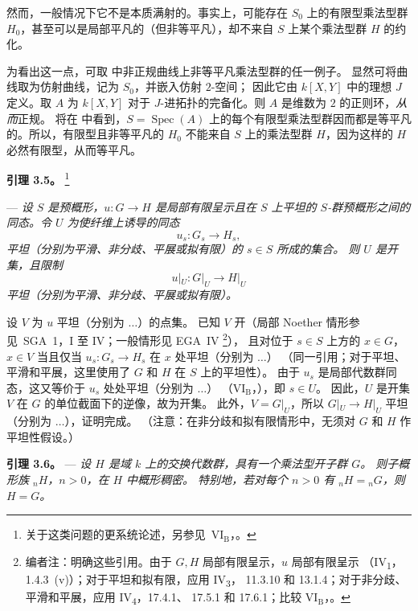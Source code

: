 然而，一般情况下它不是本质满射的。事实上，可能存在 \(S_0\) 上的有限型乘法型群
\(H_0\)，甚至可以是局部平凡的（但非等平凡），却不来自 \(S\) 上某个乘法型群
\(H\) 的约化。

为看出这一点，可取  中非正规曲线上非等平凡乘法型群的任一例子。
显然可将曲线取为仿射曲线，记为 \(S_0\)，并嵌入仿射 \(2\)-空间；
因此它由 \(k[X,Y]\) 中的理想 \(J\) 定义。取 \(A\) 为 \(k[X,Y]\) 对于
\(J\)-进拓扑的完备化。则 \(A\) 是维数为 \(2\) 的正则环，\emph{从而}正规。
将在  中看到，\(S=\operatorname{Spec}(A)\)
上的每个有限型乘法型群因而都是等平凡的。所以，有限型且非等平凡的 \(H_0\)
不能来自 \(S\) 上的乘法型群 \(H\)，因为这样的 \(H\) 必然有限型，从而等平凡。

\medskip
\noindent{}\textbf{引理 3.5。}%
\begingroup
\renewcommand{\thefootnote}{\(\ast\)}%
\footnote{关于这类问题的更系统论述，另参见\ \(\mathrm{VI}_{\mathrm B}\)，。}%
\endgroup
\addtocounter{footnote}{-1}
---
\textit{设 \(S\) 是预概形，\(u:G\to H\) 是局部有限呈示且在 \(S\) 上平坦的
\(S\)-群预概形之间的同态。令 \(U\) 为使纤维上诱导的同态
\[
  u_s:G_s\longrightarrow H_s,
\]
平坦（分别为平滑、非分歧、平展或拟有限）的 \(s\in S\) 所成的集合。
则 \(U\) 是开集，且限制
\[
  u|_U:G|_U\longrightarrow H|_U
\]
平坦（分别为平滑、非分歧、平展或拟有限）。}

设 \(V\) 为 \(u\) 平坦（分别为 \(\ldots\)）的点集。
已知 \(V\) 开（局部 Noether 情形参见\ SGA~1，I 至 IV；一般情形见 EGA~IV
\footnote{编者注：明确这些引用。由于 \(G,H\) 局部有限呈示，\(u\) 局部有限呈示
（IV\textsubscript{1}，1.4.3~(v)）；对于平坦和拟有限，应用 IV\textsubscript{3}，
11.3.10 和 13.1.4；对于非分歧、平滑和平展，应用 IV\textsubscript{4}，17.4.1、
17.5.1 和 17.6.1；比较 \(\mathrm{VI}_{\mathrm B}\)，。}），
且对位于 \(s\in S\) 上方的 \(x\in G\)，\(x\in V\) 当且仅当
\(u_s:G_s\to H_s\) 在 \(x\) 处平坦（分别为 \(\ldots\)）
（同一引用；对于平坦、平滑和平展，这里使用了 \(G\) 和 \(H\) 在 \(S\) 上的平坦性）。
由于 \(u_s\) 是局部代数群同态，这又等价于 \(u_s\) 处处平坦（分别为 \(\ldots\)）
（\(\mathrm{VI}_{\mathrm B}\)，），即 \(s\in U\)。
因此，\(U\) 是开集 \(V\) 在 \(G\) 的单位截面下的逆像，故为开集。
此外，\(V=G|_U\)，所以 \(G|_U\to H|_U\) 平坦（分别为 \(\ldots\)），证明完成。
（注意：在非分歧和拟有限情形中，无须对 \(G\) 和 \(H\) 作平坦性假设。）

\medskip
\noindent{}\textbf{引理 3.6。} ---
\textit{设 \(H\) 是域 \(k\) 上的交换代数群，具有一个乘法型开子群 \(G\)。
则子概形族 \({}_nH\)，\(n>0\)，在 \(H\) 中概形稠密。
特别地，若对每个 \(n>0\) 有 \({}_nH={}_nG\)，则 \(H=G\)。}

